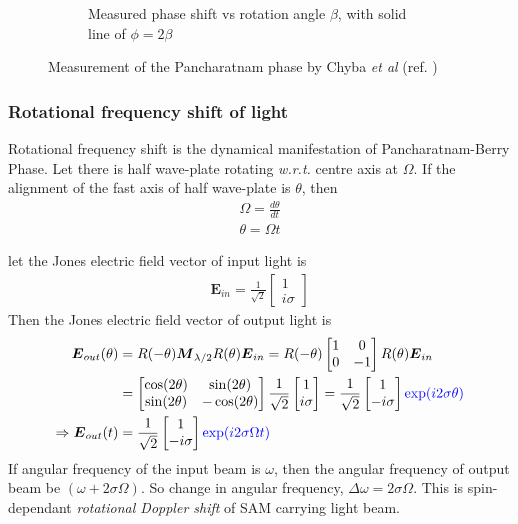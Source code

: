 \documentclass[11pt,a4paper]{article}
\numberwithin{equation}{section}
\begin{document}
\begin{figure}[H]
\begin{subfigure}[H]{0.41\textwidth}
		\caption{Measured phase shift vs rotation angle $\beta$, with solid line of $\phi=2\beta$}
		\label{fig:chyba b}
	\end{subfigure}
	\caption{Measurement of the Pancharatnam phase by Chyba \textit{et al} (ref. \cite{chyba 88})}
	\label{fig:chyba}
\end{figure}


\subsubsection{Rotational frequency shift of light}
Rotational frequency shift is the dynamical manifestation of Pancharatnam-Berry Phase. Let there is half wave-plate rotating \textit{w.r.t.} centre axis at $\Omega$. If the alignment of the fast axis of half wave-plate is $\theta$, then
\begin{align}
	\Omega = \frac{d\theta}{dt}\\
	\theta = \Omega t
\end{align}

let the Jones electric field vector of input light is
 \begin{align}
 	\boldsymbol{E}_{in} = \frac{1}{\sqrt{2}}
 	\begin{bmatrix}
 		1\\i\sigma
 	\end{bmatrix}
 \end{align}
Then the Jones electric field vector of output light is
\begin{align}
	\boldsymbol{E}_{out}(\theta)&=R(-\theta)\boldsymbol{M}_{\lambda/2}R(\theta)\boldsymbol{E}_{in}
	=R(-\theta)
	\begin{bmatrix}
		1 & 0\\
		0 & -1
	\end{bmatrix}
	R(\theta)\boldsymbol{E}_{in}\nonumber\\
	&=\begin{bmatrix}
		\cos(2\theta) & \sin(2\theta)\\
		\sin(2\theta) & -\cos(2\theta)
	\end{bmatrix}
	\frac{1}{\sqrt{2}}
	\begin{bmatrix}
		1\\i\sigma
	\end{bmatrix}
	= \frac{1}{\sqrt{2}}
	\begin{bmatrix}
		1\\-i\sigma
	\end{bmatrix}
	{\color{blue}\exp(i2\sigma\theta)}\nonumber\\
	\Rightarrow\boldsymbol{E}_{out}(t)&= \frac{1}{\sqrt{2}}
	\begin{bmatrix}
		1\\-i\sigma
	\end{bmatrix}
	{\color{blue}\exp(i2\sigma\Omega t)}
\end{align}
If angular frequency of the input beam is $\omega$, then the angular frequency of output beam be $(\omega + 2\sigma\Omega)$. So change in angular frequency, $\Delta\omega=2\sigma\Omega$. This is spin-dependant \textit{rotational Doppler shift} of SAM carrying light beam. \cite{WO}
\end{document}
